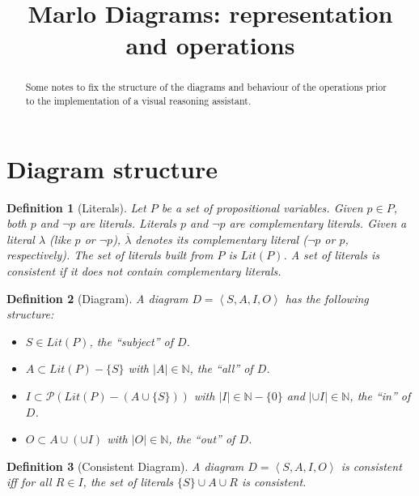 \documentclass{article}
\newtheorem{definition}{Definition}
\begin{document}
\title{Marlo Diagrams: representation and operations}
\author{}

\maketitle

\begin{abstract}
    Some notes to fix the structure of the diagrams and behaviour of the operations prior to the implementation of a visual reasoning assistant. 
\end{abstract}

\section{Diagram structure}

\begin{definition}[Literals]
Let $P$ be a set of propositional variables. Given $p\in P$, both $p$ and $\lnot p$ are \emph{literals}. Literals $p$ and $\lnot p$ are \emph{complementary literals}. Given a literal $\lambda$ (like $p$ or $\lnot p$), $\overline{\lambda}$ denotes its complementary literal ($\lnot p$ or $p$, respectively). The set of literals built from $P$ is $Lit(P)$. A set of literals is \emph{consistent} if it does not contain complementary literals. 
\end{definition}

\begin{definition}[Diagram]
A \emph{diagram} $D=\left<S,A,I,O\right>$ has the following structure:
\begin{itemize}
    \item $S\in Lit(P)$, the ``\emph{subject}'' of $D$.
    \item $A\subset Lit(P)-\{S\}$ with $|A|\in\mathds{N}$, the ``\emph{all}'' of $D$. 
    \item $I\subset \mathcal{P}\left(Lit(P)-(A\cup\{S\})\right)$ with $|I|\in \mathds{N}-\{0\}$ and $|\cup I|\in \mathds{N}$, the ``\emph{in}'' of $D$.
    \item $O\subset A\cup (\cup I)$ with $|O|\in \mathds{N}$, the ``\emph{out}'' of $D$.
\end{itemize}
\end{definition}

\begin{definition}[Consistent Diagram]
A diagram $D=\left<S,A,I,O\right>$ is \emph{consistent} iff for all $R\in I$, the set of literals $\{S\}\cup A\cup R$ is consistent. 
\end{definition}
\end{document}
